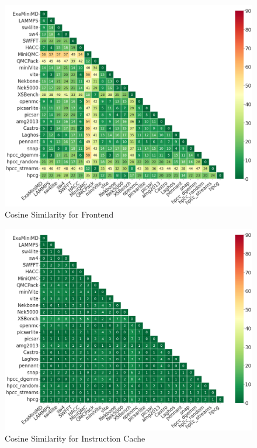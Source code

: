 \documentclass[conference]{IEEEtran}
\begin{document}
\begin{figure}[ht]
\centering
\includegraphics[width=0.9\linewidth]{figs/Frontend.png}
\caption{Cosine Similarity for Frontend }
\label{figs:cosine Frontend}
\end{figure}

\begin{figure}[ht]
\centering
\includegraphics[width=0.9\linewidth]{figs/Instruction_Cache.png}
\caption{Cosine Similarity for Instruction Cache }
\label{figs:cosine Instruction_Cache}
\end{figure}
\end{document}
